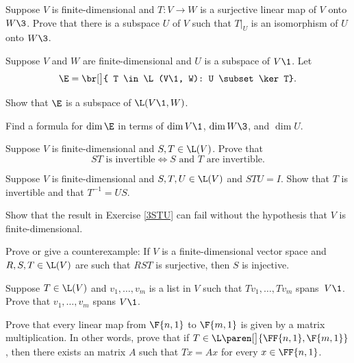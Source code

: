 \exercise
Suppose $V$ is finite-dimensional and $T \colon V \to W$ is a surjective linear map of $V$ onto $W\3$.  Prove that there is a subspace $U$ of $V$ such that $T|_U$ is an isomorphism of $U$ onto $W\3$.


\exercise
Suppose $V$ and $W$ are finite-dimensional and $U$ is a subspace of $V\1$. Let
\[ \addtolength{\belowdisplayskip}{-3bp}
\E = \br[\big]{ T \in \L(V\1, W): U \subset \ker T}.
\]
\begin{subtheorem}
\item
Show that $\E$ is a subspace of $\L(V\1, W)$.
\item
Find a formula for $\dim \E$ in terms of $\dim V\1$, $\dim W\3$, and $\dim U$.
\end{subtheorem}


\exercise
Suppose $V$ is finite-dimensional and $S, T \in \L(V)$.  Prove that \label{379}
\[
ST \text{ is invertible} \iff S \text{ and } T \text{ are invertible}.
\]
\exercisedisplayend


\exercise
Suppose $V$ is finite-dimensional and $S, T, U \in \L(V)$ and
$
STU = I$.
Show that $T$ is invertible and that $T^{-1} = US$.\label{3STU}


\exercise
Show that the result in Exercise \ref{3STU} can fail without the hypothesis that $V$ is finite-dimensional.


\exercise
Prove or give a counterexample: If $V$ is a finite-dimensional vector space and $R, S, T \in
\L(V)$ are such that $RST$ is surjective, then $S$ is  injective.


\exercise
Suppose $T \in \L(V)$ and $v_1, \dots, v_m$ is a list in $V$ such that $Tv_1, \dots, Tv_m$ spans~$V\1$. Prove that
$v_1, \dots, v_m$ spans $V\1$.

\exercise
Prove that every linear map from $\F{n,1}$ to $\F{m,1}$ is given by a matrix multiplication.  In other words, prove that if
$T \in \L\paren[\big]{\FF{n,1}, \F{m,1}}$, then there exists an  matrix $A$ such that $Tx = Ax$ for every $x \in \FF{n,1}$.


